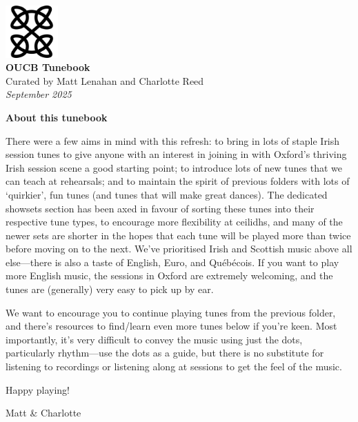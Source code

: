 \documentclass[11pt]{article}
\begin{document}

\vspace*{10\baselineskip}
\begin{center}
    \includegraphics[width=2cm]{oucb-800px.png}\\
    \vspace{4\baselineskip}
    {\Huge\textbf{OUCB Tunebook}}\\
    \vspace{4\baselineskip}
    Curated by Matt Lenahan and Charlotte Reed\\
    \textit{September 2025}
\end{center}
\clearpage


\centerline{\Large\textbf{About this tunebook}}

There were a few aims in mind with this refresh: to bring in lots of staple Irish session tunes to give anyone with an interest in joining in with Oxford's thriving Irish session scene a good starting point; to introduce lots of new tunes that we can teach at rehearsals; and to maintain the spirit of previous folders with lots of `quirkier', fun tunes (and tunes that will make great dances). The dedicated showsets section has been axed in favour of sorting these tunes into their respective tune types, to encourage more flexibility at ceilidhs, and many of the newer sets are shorter in the hopes that each tune will be played more than twice before moving on to the next. We've prioritised Irish and Scottish music above all else---there is also a taste of English, Euro, and Qu\'eb\'ecois. If you want to play more English music, the sessions in Oxford are extremely welcoming, and the tunes are (generally) very easy to pick up by ear.

We want to encourage you to continue playing tunes from the previous folder, and there's resources to find/learn even more tunes below if you're keen. Most importantly, it's very difficult to convey the music using just the dots, particularly rhythm---use the dots as a guide, but there is no substitute for listening to recordings or listening along at sessions to get the feel of the music.

Happy playing!

Matt \& Charlotte
\end{document}
